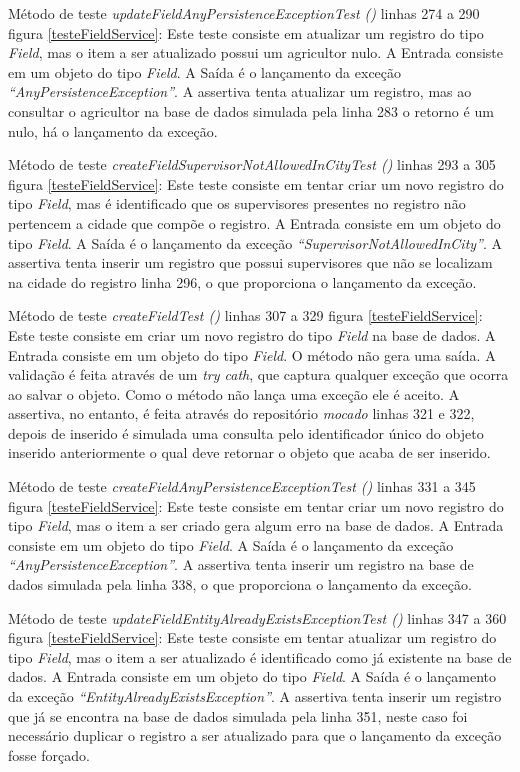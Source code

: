 Método de teste \textit{ updateFieldAnyPersistenceExceptionTest ()} linhas 274 a 290 figura \ref{testeFieldService}: Este teste consiste em atualizar um registro do tipo \textit{Field}, mas o item a ser atualizado possui um agricultor nulo. A Entrada consiste em um objeto do tipo \textit{Field}. A Saída é o lançamento da exceção \textit{“AnyPersistenceException”}. A assertiva tenta atualizar um registro, mas ao consultar o agricultor na base de dados simulada pela linha 283 o retorno é um nulo, há o lançamento da exceção.  

Método de teste \textit{ createFieldSupervisorNotAllowedInCityTest ()} linhas 293 a 305 figura \ref{testeFieldService}: Este teste consiste em tentar criar um novo registro do tipo \textit{Field}, mas é identificado que os supervisores presentes no registro não pertencem a cidade que compõe o registro. A Entrada consiste em um objeto do tipo \textit{Field}. A Saída é o lançamento da exceção \textit{“SupervisorNotAllowedInCity”}. A assertiva tenta inserir um registro que possui supervisores que não se localizam na cidade do registro linha 296, o que proporciona o lançamento da exceção.  

Método de teste \textit{ createFieldTest ()} linhas 307 a 329 figura \ref{testeFieldService}: Este teste consiste em criar um novo registro do tipo \textit{Field} na base de dados. A Entrada consiste em um objeto do tipo \textit{Field}. O método não gera uma saída. A validação é feita através de um \textit{try cath}, que captura qualquer exceção que ocorra ao salvar o objeto. Como o método não lança uma exceção ele é aceito. A assertiva, no entanto, é feita através do repositório \textit{mocado} linhas 321 e 322, depois de inserido é simulada uma consulta pelo identificador único do objeto inserido anteriormente o qual deve retornar o objeto que acaba de ser inserido. 

Método de teste \textit{ createFieldAnyPersistenceExceptionTest ()} linhas 331 a 345 figura \ref{testeFieldService}: Este teste consiste em tentar criar um novo registro do tipo \textit{Field}, mas o item a ser criado gera algum erro na base de dados. A Entrada consiste em um objeto do tipo \textit{Field}. A Saída é o lançamento da exceção \textit{“AnyPersistenceException”}. A assertiva tenta inserir um registro na base de dados simulada pela linha 338, o que proporciona o lançamento da exceção.  

Método de teste \textit{ updateFieldEntityAlreadyExistsExceptionTest ()} linhas 347 a 360 figura \ref{testeFieldService}: Este teste consiste em tentar atualizar um registro do tipo \textit{Field}, mas o item a ser atualizado é identificado como já existente na base de dados. A Entrada consiste em um objeto do tipo \textit{Field}. A Saída é o lançamento da exceção \textit{“EntityAlreadyExistsException”}. A assertiva tenta inserir um registro que já se encontra na base de dados simulada pela linha 351, neste caso foi necessário duplicar o registro a ser atualizado para que o lançamento da exceção fosse forçado.  

